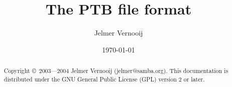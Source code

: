 \documentclass[a4paper]{article}
\begin{document}
\title{The PTB file format}
\date{\today}
\author{Jelmer Vernooij}
\maketitle

\begin{abstract}
    Copyright \copyright\ 2003---2004  Jelmer Vernooij (jelmer@samba.org).
	This documentation is distributed under the GNU General Public License (GPL) version 2 or later.
\end{abstract}

\lstset{language=C}

\tableofcontents
\end{document}
